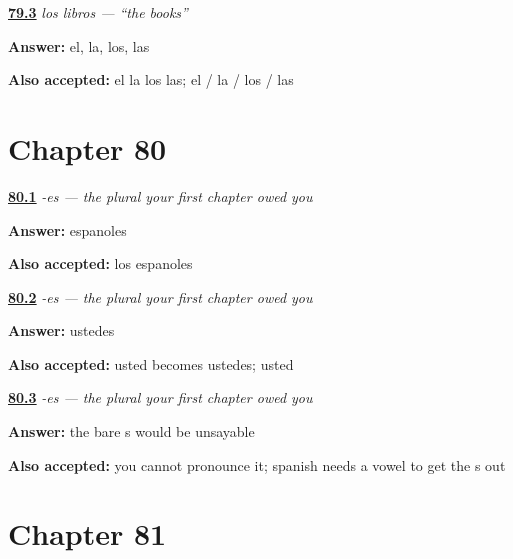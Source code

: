 \noindent\begin{minipage}[t]{\linewidth}
\raggedright
\hyperlink{review-ES-C44-los-four}{\textbf{79.3}} \emph{los libros — \textquotedblleft{}the books\textquotedblright{}}\par
\small \textbf{Answer:} el, la, los, las\par
\footnotesize \textbf{Also accepted:} el la los las; el / la / los / las
\end{minipage}\par\medskip

\section*{Chapter 80}

\noindent\begin{minipage}[t]{\linewidth}
\raggedright
\hyperlink{review-ES-C44-plural-es-espanol}{\textbf{80.1}} \emph{-es — the plural your first chapter owed you}\par
\small \textbf{Answer:} espanoles\par
\footnotesize \textbf{Also accepted:} los espanoles
\end{minipage}\par\medskip

\noindent\begin{minipage}[t]{\linewidth}
\raggedright
\hyperlink{review-ES-C44-plural-es-already}{\textbf{80.2}} \emph{-es — the plural your first chapter owed you}\par
\small \textbf{Answer:} ustedes\par
\footnotesize \textbf{Also accepted:} usted becomes ustedes; usted
\end{minipage}\par\medskip

\noindent\begin{minipage}[t]{\linewidth}
\raggedright
\hyperlink{review-ES-C44-plural-es-why}{\textbf{80.3}} \emph{-es — the plural your first chapter owed you}\par
\small \textbf{Answer:} the bare s would be unsayable\par
\footnotesize \textbf{Also accepted:} you cannot pronounce it; spanish needs a vowel to get the s out
\end{minipage}\par\medskip

\section*{Chapter 81}

